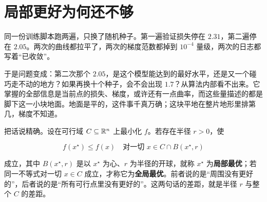 \section{局部更好为何还不够}
\label{sec:09-Convex-Optimization/01-Optimization-Foundations/02}

同一份训练脚本跑两遍，只换了随机种子。第一遍验证损失停在 \(2.31\)，第二遍停在 \(2.05\)。两次的曲线都拉平了，两次的梯度范数都掉到 \(10^{-4}\) 量级，两次的日志都写着``已收敛''。

于是问题变成：第二次那个 \(2.05\)，是这个模型能达到的最好水平，还是又一个碰巧走不动的地方？如果再换十个种子，会不会出现 \(1.7\)？从算法内部看不出来。它掌握的全部信息是当前点的损失、梯度，或许还有一点曲率，而这些量描述的都是脚下这一小块地面。地面是平的，这件事千真万确；这块平地在整片地形里排第几，梯度不知道。

把话说精确。设在可行域 \(C\subseteq\mathbb{R}^n\) 上最小化 \(f\)。若存在半径 \(r>0\)，使

\[
f(x^\star)\le f(x)\quad\text{对一切 }x\in C\cap B(x^\star,r)
\]

成立，其中 \(B(x^\star,r)\) 是以 \(x^\star\) 为心、\(r\) 为半径的开球，就称 \(x^\star\) 为\textbf{局部最优}；若同一不等式对一切 \(x\in C\) 成立，才称它为\textbf{全局最优}。前者说的是``周围没有更好的''，后者说的是``所有可行点里没有更好的''。这两句话的差距，就是半径 \(r\) 与整个 \(C\) 的差距。

